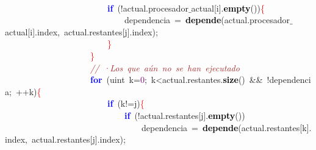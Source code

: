 \mbox{} \\
\mbox{}\ \ \ \ \ \ \ \ \ \ \ \ \ \ \ \ \ \ \ \ \ \ \ \ \textbf{\textcolor{Blue}{if}}\ \textcolor{BrickRed}{(!}actual\textcolor{BrickRed}{.}procesador$\_$actual\textcolor{BrickRed}{[}i\textcolor{BrickRed}{].}\textbf{\textcolor{Black}{empty}}\textcolor{BrickRed}{())}\textcolor{Red}{\{} \\
\mbox{}\ \ \ \ \ \ \ \ \ \ \ \ \ \ \ \ \ \ \ \ \ \ \ \ \ \ \ \ dependencia\ \textcolor{BrickRed}{=}\ \textbf{\textcolor{Black}{depende}}\textcolor{BrickRed}{(}actual\textcolor{BrickRed}{.}procesador$\_$actual\textcolor{BrickRed}{[}i\textcolor{BrickRed}{].}index\textcolor{BrickRed}{,}\ actual\textcolor{BrickRed}{.}restantes\textcolor{BrickRed}{[}j\textcolor{BrickRed}{].}index\textcolor{BrickRed}{);} \\
\mbox{}\ \ \ \ \ \ \ \ \ \ \ \ \ \ \ \ \ \ \ \ \ \ \ \ \textcolor{Red}{\}} \\
\mbox{}\ \ \ \ \ \ \ \ \ \ \ \ \ \ \ \ \ \ \ \ \textcolor{Red}{\}} \\
\mbox{}\ \ \ \ \ \ \ \ \ \ \ \ \ \ \ \ \ \ \ \ \textit{\textcolor{Brown}{//\ ·Los\ que\ aún\ no\ se\ han\ ejecutado}} \\
\mbox{}\ \ \ \ \ \ \ \ \ \ \ \ \ \ \ \ \ \ \ \ \textbf{\textcolor{Blue}{for}}\ \textcolor{BrickRed}{(}\textcolor{TealBlue}{uint}\ k\textcolor{BrickRed}{=}\textcolor{Purple}{0}\textcolor{BrickRed}{;}\ k\textcolor{BrickRed}{\textless{}}actual\textcolor{BrickRed}{.}restantes\textcolor{BrickRed}{.}\textbf{\textcolor{Black}{size}}\textcolor{BrickRed}{()}\ \textcolor{BrickRed}{\&\&}\ \textcolor{BrickRed}{!}dependencia\textcolor{BrickRed}{;}\ \textcolor{BrickRed}{++}k\textcolor{BrickRed}{)}\textcolor{Red}{\{} \\
\mbox{}\ \ \ \ \ \ \ \ \ \ \ \ \ \ \ \ \ \ \ \ \ \ \ \ \textbf{\textcolor{Blue}{if}}\ \textcolor{BrickRed}{(}k\textcolor{BrickRed}{!=}j\textcolor{BrickRed}{)}\textcolor{Red}{\{} \\
\mbox{}\ \ \ \ \ \ \ \ \ \ \ \ \ \ \ \ \ \ \ \ \ \ \ \ \ \ \ \ \textbf{\textcolor{Blue}{if}}\ \textcolor{BrickRed}{(!}actual\textcolor{BrickRed}{.}restantes\textcolor{BrickRed}{[}j\textcolor{BrickRed}{].}\textbf{\textcolor{Black}{empty}}\textcolor{BrickRed}{())} \\
\mbox{}\ \ \ \ \ \ \ \ \ \ \ \ \ \ \ \ \ \ \ \ \ \ \ \ \ \ \ \ \ \ \ \ dependencia\ \textcolor{BrickRed}{=}\ \textbf{\textcolor{Black}{depende}}\textcolor{BrickRed}{(}actual\textcolor{BrickRed}{.}restantes\textcolor{BrickRed}{[}k\textcolor{BrickRed}{].}index\textcolor{BrickRed}{,}\ actual\textcolor{BrickRed}{.}restantes\textcolor{BrickRed}{[}j\textcolor{BrickRed}{].}index\textcolor{BrickRed}{);} \\
